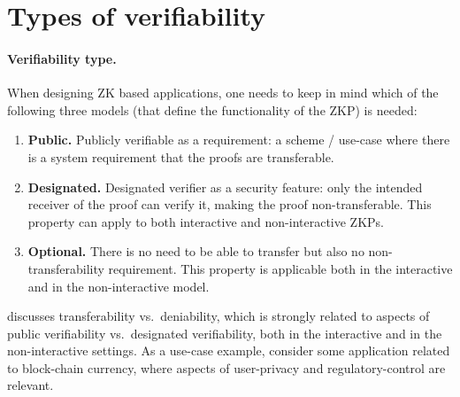 \section{Types of verifiability}   %
\label{apps:scope-use-cases}


\paragraph{Verifiability type.}

When designing ZK based applications, one needs to keep in mind which of the following three models (that define the functionality of the ZKP) is needed:

\begin{enumerate}

    \item \textbf{Public.}
		Publicly verifiable as a requirement: a scheme / use-case where 
	there is a system requirement that the proofs are transferable. %

		
    \item \textbf{Designated.} 
		Designated verifier as a security feature: only the intended receiver of the proof can verify it, making the proof non-transferable. 
		This property can apply to both interactive and non-interactive ZKPs.

		
    \item \textbf{Optional.} %
		There is no need to be able to transfer but also no non-transferability requirement. %
		This property is applicable both in the interactive and in the non-interactive model.

\end{enumerate}


	 discusses transferability vs.\ deniability, %
which is strongly related to aspects of public verifiability vs.\ designated verifiability,
both in the interactive and in the non-interactive settings.
	As a use-case example, consider some application related to block-chain currency, where aspects of user-privacy and regulatory-control are relevant.
	
